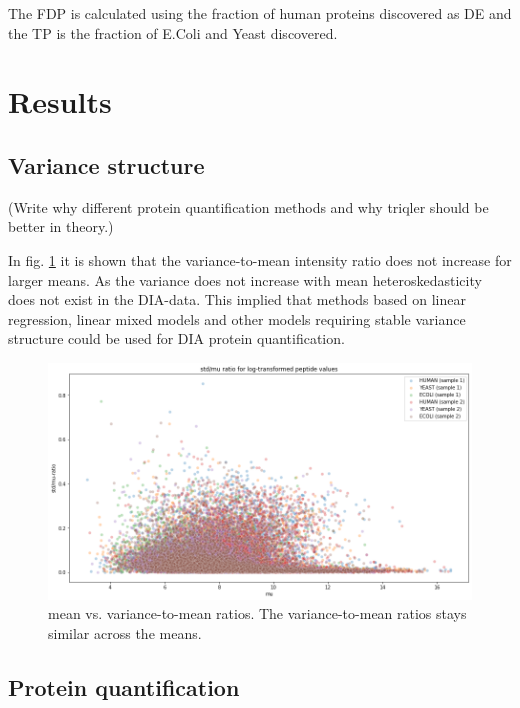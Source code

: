 \documentclass[10pt,letterpaper]{article}
\begin{document}
The FDP is calculated using the fraction of human proteins discovered as DE and the TP is the fraction of E.Coli and Yeast discovered. 



\section*{Results}

\subsection*{Variance structure}
(Write why different protein quantification methods and why triqler should be better in theory.) 

 In fig. \ref{fig:variance_to_mean_ratio} it is shown that the variance-to-mean intensity ratio does not increase for larger means. As the variance does not increase with mean heteroskedasticity does not exist in the DIA-data. This implied that methods based on linear regression, linear mixed models and other models requiring stable variance structure could be used for DIA protein quantification.


\begin{figure}[H]
    \centering
    \includegraphics[width=12cm]{../../result/2021-08-13_docs_plots/variance_to_mean_plot.png}
    \caption{mean vs. variance-to-mean ratios. The variance-to-mean ratios stays similar across the means.}
    \label{fig:variance_to_mean_ratio}
\end{figure}



\subsection*{Protein quantification}
\end{document}
